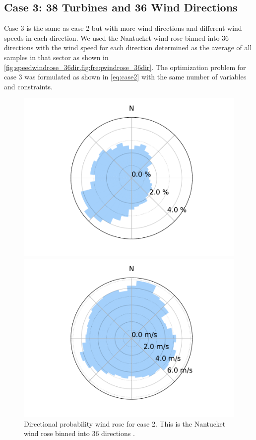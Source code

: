 \documentclass[journal abbreviation, manuscript]{copernicus}
\begin{document}
	\subsection{Case 3: 38 Turbines and 36 Wind Directions}
	Case 3 is the same as case 2 but with more wind directions and different wind speeds in each direction. We used the Nantucket wind rose binned into 36 directions with the wind speed for each direction determined as the average of all samples in that sector as shown in \ref{fig:speedwindrose_36dir,fig:freqwindrose_36dir}. The optimization problem for case 3 was formulated as shown in \ref{eq:case2} with the same number of variables and constraints.
	\begin{figure}[h!]
		\centering
		\begin{minipage}[t]{18pc}
			\centering
			\includegraphics[width=\textwidth, trim={1.5cm 0cm 1.5cm 0cm}, clip]{final_images/windroses/freqwindrose_36_dir.pdf}
			\caption{Directional probability wind rose for case 2. This is the Nantucket wind rose binned into 36 directions \cite{wrcc2017}.}
			\label{fig:freqwindrose_36dir}
		\end{minipage} \hspace{1pc}%
		\begin{minipage}[t]{18pc}
			\centering
			\includegraphics[width=\textwidth, trim={1.5cm, 0cm, 1.5cm, 0cm}, clip]{final_images/windroses/speedwindrose_36_dir.pdf}

\end{minipage}
\end{figure}
\end{document}
